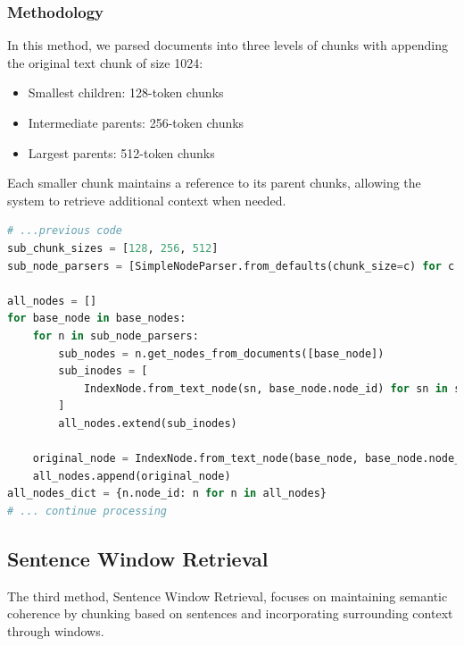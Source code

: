 \subsubsection{Methodology}
In this method, we parsed documents into three levels of chunks with appending the original text chunk of size 1024:
\begin{itemize}
    \item Smallest children: 128-token chunks
    \item Intermediate parents: 256-token chunks
    \item Largest parents: 512-token chunks
\end{itemize}
Each smaller chunk maintains a reference to its parent chunks, allowing the system to retrieve additional context when needed.

\begin{lstlisting}[language=Python, caption=Small2Big Chunking Method, label=lst:small2big_chunking]
# ...previous code
sub_chunk_sizes = [128, 256, 512]
sub_node_parsers = [SimpleNodeParser.from_defaults(chunk_size=c) for c in sub_chunk_sizes]

all_nodes = []
for base_node in base_nodes:
    for n in sub_node_parsers:
        sub_nodes = n.get_nodes_from_documents([base_node])
        sub_inodes = [
            IndexNode.from_text_node(sn, base_node.node_id) for sn in sub_nodes
        ]
        all_nodes.extend(sub_inodes)

    original_node = IndexNode.from_text_node(base_node, base_node.node_id) # also add original node to node
    all_nodes.append(original_node)
all_nodes_dict = {n.node_id: n for n in all_nodes}
# ... continue processing
\end{lstlisting}

\subsection{Sentence Window Retrieval}\label{subsec:sentence-window-retrieval}
The third method, Sentence Window Retrieval, focuses on maintaining semantic coherence by chunking based on sentences and incorporating surrounding context through windows.
